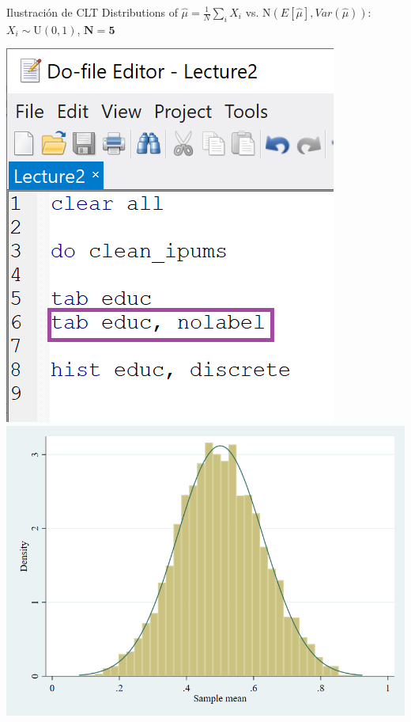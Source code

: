 \documentclass[11pt,handout,aspectratio=169]{beamer}
\begin{document}
\begin{frame}{Ilustración de CLT}
	\vspace{0.2cm}
	Distributions of $\hat{\mu}=\frac{1}{N}\sum_i X_i$ vs. $\mathrm{N}(E[\hat\mu],Var(\hat{\mu}))$: $X_i\sim \mathrm{U}(0,1)$, $\mathbf{N=5}$
	
	\begin{center}
		\includegraphics[scale=0.4]{Stata3.png} \includegraphics[scale=0.25]{sims5.png}
	\end{center}
	
\end{frame}
\end{document}
